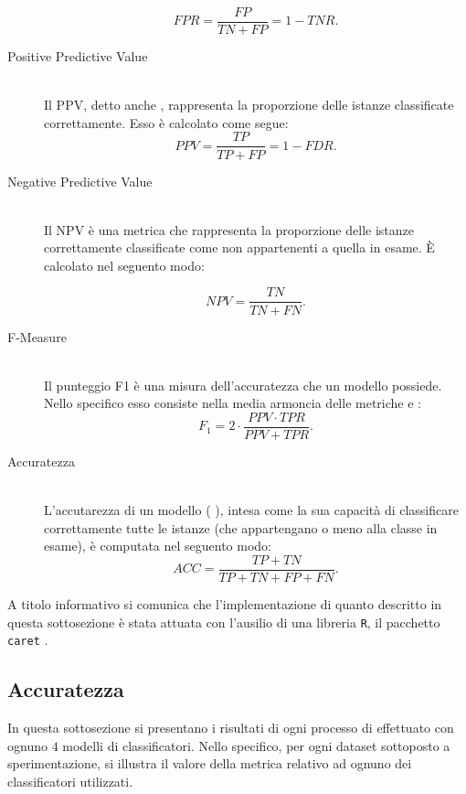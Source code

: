\begin{description}
	\[FPR = \frac{FP}{TN + FP} = 1 - TNR\text{.}\]
	\item[Positive Predictive Value] \hfill \\
	Il \acf{PPV}, detto anche \emph{}, rappresenta la proporzione delle istanze classificate correttamente. Esso è calcolato come segue:
	\[PPV = \frac{TP}{TP + FP} = 1 - FDR\text{.}\]
	\item[Negative Predictive Value] \hfill \\
	Il \acf{NPV} è una metrica che rappresenta la proporzione delle istanze correttamente classificate come non appartenenti a quella in esame. \`E calcolato nel seguento modo:\par
	\[NPV = \frac{TN}{TN + FN}\text{.}\]
	\item[F-Measure] \hfill \\
	Il punteggio \acf{F1} è una misura dell'accuratezza che un modello possiede. Nello specifico esso consiste nella media armoncia delle metriche \emph{} e \emph{}:
	\[F_1 = 2 \cdot \frac{PPV \cdot TPR}{PPV + TPR}\text{.}\]
	\item[Accuratezza] \hfill \\
	L'accutarezza di un modello (\ie{} \emph{}), intesa come la sua capacità di classificare correttamente tutte le istanze (che appartengano o meno alla classe in esame), è computata nel seguento modo:
	\[ACC = \frac{TP + TN}{TP + TN + FP + FN}\text{.}\]
\end{description}

A titolo informativo si comunica che l'implementazione di quanto descritto in questa sottosezione è stata attuata con l'ausilio di una libreria \lstinline$R$, il pacchetto \lstinline$caret$ \citep{CARET2013}.

\subsection{Accuratezza}
In questa sottosezione si presentano i risultati di ogni processo di \emph{} effettuato con ognuno $4$ modelli di classificatori. Nello specifico, per ogni dataset sottoposto a sperimentazione, si illustra il valore della metrica \emph{} relativo ad ognuno dei classificatori utilizzati.



